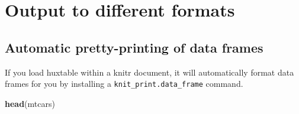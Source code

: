 \documentclass[]{article}
\newenvironment{Shaded}{\begin{snugshade}}{\end{snugshade}}
\newcommand{\KeywordTok}[1]{\textcolor[rgb]{0.13,0.29,0.53}{\textbf{#1}}}
\newcommand{\NormalTok}[1]{#1}
\begin{document}
\section{Output to different formats}\label{output-to-different-formats}

\subsection{Automatic pretty-printing of data
frames}\label{automatic-pretty-printing-of-data-frames}

If you load huxtable within a knitr document, it will automatically
format data frames for you by installing a
\texttt{knit\_print.data\_frame} command.

\FloatBarrier

\begin{Shaded}
\begin{Highlighting}[]
\KeywordTok{head}\NormalTok{(mtcars)}
\end{Highlighting}
\end{Shaded}
\end{document}
